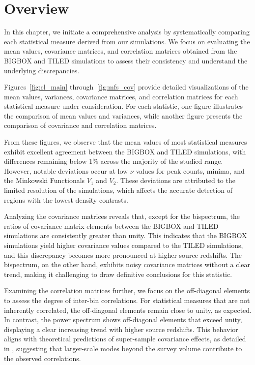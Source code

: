 \section{Overview}
In this chapter, we initiate a comprehensive analysis by systematically comparing each statistical measure derived from our simulations. We focus on evaluating the mean values, covariance matrices, and correlation matrices obtained from the BIGBOX and TILED simulations to assess their consistency and understand the underlying discrepancies.

Figures~\ref{fig:cl_main} through~\ref{fig:mfs_cov} provide detailed visualizations of the mean values, variances, covariance matrices, and correlation matrices for each statistical measure under consideration. For each statistic, one figure illustrates the comparison of mean values and variances, while another figure presents the comparison of covariance and correlation matrices. 

From these figures, we observe that the mean values of most statistical measures exhibit excellent agreement between the BIGBOX and TILED simulations, with differences remaining below $1\%$ across the majority of the studied range. However, notable deviations occur at low $\nu$ values for peak counts, minima, and the Minkowski Functionals $V_1$ and $V_2$. These deviations are attributed to the limited resolution of the simulations, which affects the accurate detection of regions with the lowest density contrasts.

Analyzing the covariance matrices reveals that, except for the bispectrum, the ratios of covariance matrix elements between the BIGBOX and TILED simulations are consistently greater than unity. This indicates that the BIGBOX simulations yield higher covariance values compared to the TILED simulations, and this discrepancy becomes more pronounced at higher source redshifts. The bispectrum, on the other hand, exhibits noisy covariance matrices without a clear trend, making it challenging to draw definitive conclusions for this statistic.

Examining the correlation matrices further, we focus on the off-diagonal elements to assess the degree of inter-bin correlations. For statistical measures that are not inherently correlated, the off-diagonal elements remain close to unity, as expected. In contrast, the power spectrum shows off-diagonal elements that exceed unity, displaying a clear increasing trend with higher source redshifts. This behavior aligns with theoretical predictions of super-sample covariance effects, as detailed in \citet{PhysRevD.87.123504}, suggesting that larger-scale modes beyond the survey volume contribute to the observed correlations.

